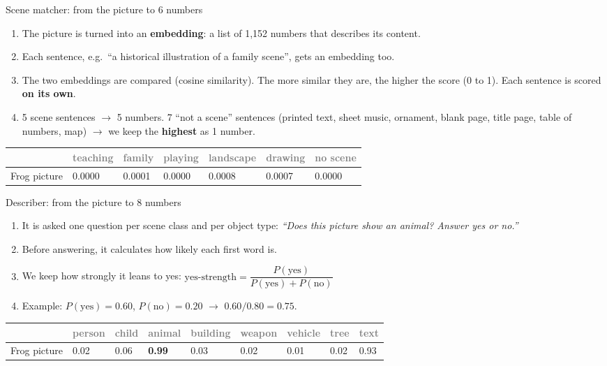 \documentclass[aspectratio=169,11pt]{beamer}
\newcommand{\h}[1]{\textcolor{grey}{#1}}
\newcommand{\remark}[1]{\par\vspace{0.35cm}{\small\textcolor{grey}{#1}}}
\begin{document}
\begin{frame}{Scene matcher: from the picture to 6 numbers}
\small
\begin{enumerate}\setlength\itemsep{3pt}
  \item The picture is turned into an \textbf{embedding}: a list of 1,152 numbers that describes its content.
  \item Each sentence, e.g.\ ``a historical illustration of a family scene'', gets an embedding too.
  \item The two embeddings are compared (cosine similarity). The more similar they are, the higher the score (0 to 1). Each sentence is scored \textbf{on its own}.
  \item 5 scene sentences $\to$ 5 numbers. 7 ``not a scene'' sentences (printed text, sheet music, ornament, blank page, title page, table of numbers, map) $\to$ we keep the \textbf{highest} as 1 number.
\end{enumerate}
\vspace{0.2cm}
\small
\begin{tabular}{@{}l *{6}{C{1.45cm}}@{}}
\toprule
 & \h{teaching} & \h{family} & \h{playing} & \h{landscape} & \h{drawing} & \h{no scene}\\
\midrule
Frog picture & 0.0000 & 0.0001 & 0.0000 & 0.0008 & 0.0007 & 0.0000\\
\bottomrule
\end{tabular}
\remark{For the frog no sentence fits well. For a page of sheet music a ``not a scene'' sentence typically fits strongly (about 0.89).}
\end{frame}

\begin{frame}{Describer: from the picture to 8 numbers}
\begin{enumerate}\setlength\itemsep{5pt}
  \item It is asked one question per scene class and per object type: \emph{``Does this picture show an animal? Answer yes or no.''}
  \item Before answering, it calculates how likely each first word is.
  \item We keep how strongly it leans to yes:\quad
        $\text{yes-strength} = \dfrac{P(\text{yes})}{P(\text{yes}) + P(\text{no})}$
  \item Example: $P(\text{yes}) = 0.60$, $P(\text{no}) = 0.20$ $\to$ $0.60 / 0.80 = \mathbf{0.75}$.
\end{enumerate}
\vspace{0.3cm}
\footnotesize
\begin{tabular}{@{}l *{8}{C{1.1cm}}@{}}
\toprule
 & \h{person} & \h{child} & \h{animal} & \h{building} & \h{weapon} & \h{vehicle} & \h{tree} & \h{text}\\
\midrule
Frog picture & 0.02 & 0.06 & \textbf{0.99} & 0.03 & 0.02 & 0.01 & 0.02 & 0.93\\
\bottomrule
\end{tabular}
\remark{Sure about the animal, and a strong yes to text, which the object finder hardly sees (0.04). How much each answer counts is learned from labelled pictures.}
\end{frame}
\end{document}
